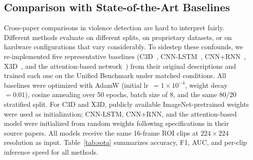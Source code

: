 \documentclass[conference]{IEEEtran}
\begin{document}
\subsection{Comparison with State-of-the-Art Baselines}

\begin{table}[!htbp]
\centering
\caption{Comparison with state-of-the-art methods on the Unified Benchmark}
\label{tab:sota}
\end{table}

Cross-paper comparisons in violence detection are hard to interpret fairly. Different methods evaluate on different splits, on proprietary datasets, or on hardware configurations that vary considerably. To sidestep these confounds, we re-implemented five representative baselines (C3D~\cite{ding_violence_2014}, CNN-LSTM~\cite{patel_realtime_2021}, CNN+RNN~\cite{traore_violence_2024}, X3D~\cite{pathak_streamlining_2024}, and the attention-based network~\cite{pan_violence_2022}) from their original descriptions and trained each one on the Unified Benchmark under matched conditions. All baselines were optimized with AdamW (initial lr~$= 1\times10^{-4}$, weight decay~$= 0.01$), cosine annealing over 50 epochs, batch size of 8, and the same 80/20 stratified split. For C3D and X3D, publicly available ImageNet-pretrained weights were used as initialization; CNN-LSTM, CNN+RNN, and the attention-based model were initialized from random weights following specifications in their source papers. All models receive the same 16-frame ROI clips at $224\times224$ resolution as input. Table~\ref{tab:sota} summarizes accuracy, F1, AUC, and per-clip inference speed for all methods.
\end{document}
